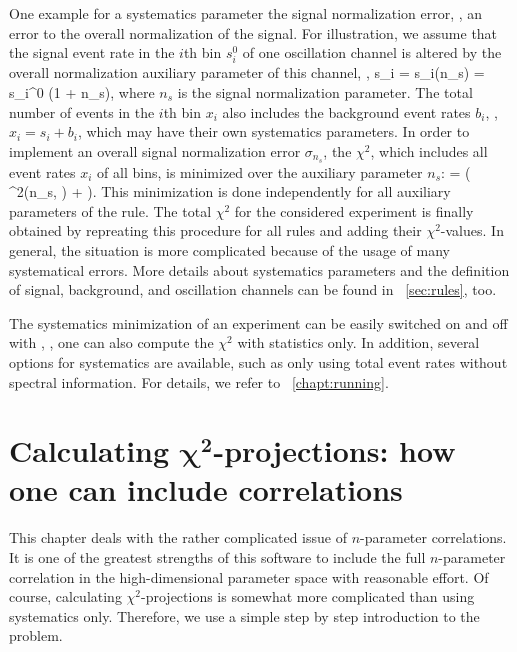  One example for a systematics parameter the signal normalization error, \ie, an error to the overall normalization of the signal. For illustration, we assume that the signal event rate in the $i$th bin $s_i^0$ of one oscillation channel is altered by the overall normalization auxiliary parameter of this channel, \ie , 
\be
 s_i = s_i(n_s) = s_i^0 \cdot (1 + n_s),
\ee
where $n_s$ is the signal normalization parameter. The total number of events in the $i$th bin $x_i$ also includes the background event rates $b_i$, \ie, $x_i = s_i + b_i$, which may have their own systematics parameters.
In order to implement an overall signal normalization error $\sigma_{n_s}$,  the $\chi^2$, which includes all event rates $x_i$ of all bins, is minimized over the auxiliary parameter $n_s$:
\be
  =  \left(  \chi^2(n_s, \hdots) +  \right).
\ee 
This minimization is done independently for all auxiliary parameters of the rule. The total $\chi^2$ for the considered experiment is finally obtained by repreating this procedure for all rules and adding their $\chi^2$-values. In general, the situation is more complicated because of the usage of many systematical errors. More details about systematics parameters and the definition of signal, background, and oscillation channels can be found in \Sec~\ref{sec:rules}, too.

The systematics minimization of an experiment can be easily switched on and off with , \ie, one can also compute the $\chi^2$ with statistics only. In addition, several options for 
systematics are available, such as only using total event rates without
spectral information. For details, we refer to \Chapt~\ref{chapt:running}.

\chapter[Calculating $\chi^2$-projections: how one can include correlations]{Calculating $\boldsymbol{\chi^2}$-projections: how one can include correlations}
\label{chapt:correlations}

This chapter deals with the rather complicated issue of $n$-parameter correlations. It is one of the greatest strengths of this software 
to include the full $n$-parameter correlation in the high-dimensional parameter space with reasonable effort. Of course, calculating $\chi^2$-projections is somewhat more complicated than using systematics only. Therefore, we use a simple step by step introduction to the problem. 

